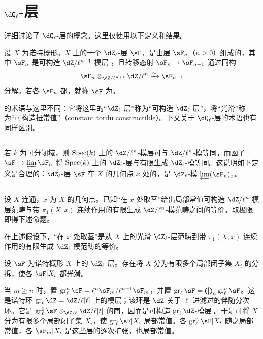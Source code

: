 \section{\texorpdfstring{$\dQ_\ell$}{Ql}-层}\label{II:2}
\cite[V、VI]{sga5} 详细讨论了 $\dQ_\ell$-层的概念。这里仅使用以下定义和结果。
\begin{definition_}\label{II:2-1}
设 $X$ 为诺特概形。$X$ 上的一个 $\dZ_\ell$-层 $\sF$，是由层 $\sF_n$（$n\geqslant0$）组成的，其中 $\sF_n$ 是可构造 $\dZ/\ell^{n+1}$-模层 \cite[IX.2]{sga4}，且转移态射 $\sF_n\to\sF_{n-1}$ 通过同构
\[\sF_n\otimes_{\dZ/\ell^{n+1}}\dZ/\ell^n\iso\sF_{n-1}\]
分解。若各 $\sF_n$ 都，就称 $\sF$ 为。
\end{definition_}
\cite{sga5} 的术语与这里不同：它将这里的“$\dZ_\ell$-层”称为“可构造 $\dZ_\ell$-层”，将“光滑”称为“可构造扭常值”（constant tordu constructible）。下文关于 $\dQ_\ell$-层的术语也有同样区别。

\subsection{}\label{II:2-2}
若 $k$ 为可分闭域，则 $\operatorname{Spec}(k)$ 上的 $\dZ/\ell^n$-模层可与 $\dZ/\ell^n$-模等同，而函子 $\sF\mapsto\varprojlim\sF_n$ 将 $\operatorname{Spec}(k)$ 上的 $\dZ_\ell$-层与有限生成 $\dZ_\ell$-模等同。这说明如下定义是合理的：$\dZ_\ell$-层 $\sF$ 在 $X$ 的几何点 $x$ 处的，是 $\dZ_\ell$-模 $\varprojlim(\sF_n)_x$。

\subsection{}\label{II:2-3}
设 $X$ 连通，$x$ 为 $X$ 的几何点。已知“在 $x$ 处取茎”给出局部常值可构造 $\dZ/\ell^n$-模层范畴与带 $\pi_1(X,x)$ 连续作用的有限生成 $\dZ/\ell^n$-模范畴之间的等价。取极限即得下述命题。
\begin{proposition_}\label{II:2-4}
在上述假设下，“在 $x$ 处取茎”是从 $X$ 上的光滑 $\dZ_\ell$-层范畴到带 $\pi_1(X,x)$ 连续作用的有限生成 $\dZ_\ell$-模范畴的等价。
\end{proposition_}

\begin{proposition_}\label{II:2-5}
设 $\sF$ 为诺特概形 $X$ 上的 $\dZ_\ell$-层。存在将 $X$ 分为有限多个局部闭子集 $X_i$ 的分拆，使各 $\sF|X_i$ 都光滑。
\end{proposition_}
当 $m\geqslant n$ 时，置 $\gr_\ell^n\sF=\ell^n\sF_m/\ell^{n+1}\sF_m$，并置 $\gr_\ell\sF=\bigoplus_n\gr_\ell^n\sF$。这是诺特环 $\gr_\ell\dZ=\dZ/\ell[t]$ 上的模层；该环是 $\dZ$ 关于 $\ell$-进滤过的伴随分次环。它是 $\gr_\ell^0\sF\otimes_{\dZ/\ell}\dZ/\ell[t]$ 的商，因而是可构造 $\gr_\ell\dZ$-模层 \cite[IX.2]{sga4}。于是可将 $X$ 分为有限多个局部闭子集 $X_i$，使 $\gr_\ell\sF|X_i$ 局部常值。各 $\gr_\ell^n\sF|X_i$ 随之局部常值，各 $\sF_m|X_i$ 是这些层的逐次扩张，也局部常值。

